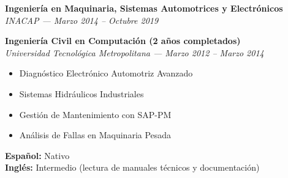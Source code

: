 \documentclass[10pt,letterpaper]{article}
\begin{document}
\vspace{0.3cm}

\vspace{0.4cm}

\vspace{0.3cm}

\noindent \textbf{Ingeniería en Maquinaria, Sistemas Automotrices y Electrónicos} \\
\textit{INACAP — Marzo 2014 – Octubre 2019}

\vspace{0.2cm}

\noindent \textbf{Ingeniería Civil en Computación (2 años completados)} \\
\textit{Universidad Tecnológica Metropolitana — Marzo 2012 – Marzo 2014}

\vspace{0.4cm}


\vspace{0.3cm}

\begin{itemize}
    \item Diagnóstico Electrónico Automotriz Avanzado
    \item Sistemas Hidráulicos Industriales
    \item Gestión de Mantenimiento con SAP-PM
    \item Análisis de Fallas en Maquinaria Pesada
\end{itemize}

\vspace{0.4cm}


\vspace{0.3cm}

\noindent \textbf{Español:} Nativo \\
\noindent \textbf{Inglés:} Intermedio (lectura de manuales técnicos y documentación)
\end{document}
